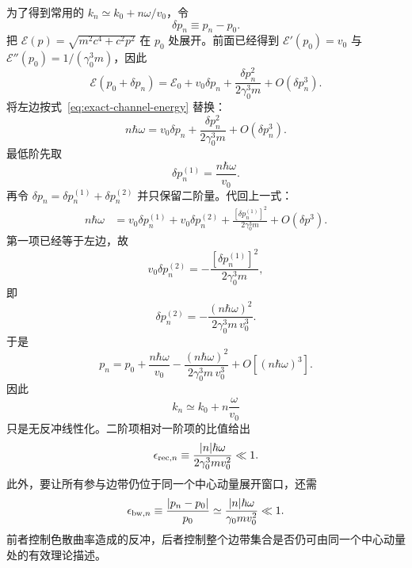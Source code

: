为了得到常用的 $k_n\simeq k_0+n\omega/v_0$，令
\begin{equation}
\delta p_n\equiv p_n-p_0.
\end{equation}
把
\(
\mathcal E(p)=\sqrt{m^2c^4+c^2p^2}
\)
在 $p_0$ 处展开。前面已经得到
\(
\mathcal E'(p_0)=v_0
\)
与
\(
\mathcal E''(p_0)=1/(\gamma_0^3m)
\)，因此
\begin{equation}
\mathcal E(p_0+\delta p_n)
=\mathcal E_0
+v_0\delta p_n
+\frac{\delta p_n^2}{2\gamma_0^3m}
+O(\delta p_n^3).
\label{eq:dispersion-channel-expand}
\end{equation}
将左边按式~\cref{eq:exact-channel-energy} 替换：
\begin{equation}
n\hbar\omega
=v_0\delta p_n
+\frac{\delta p_n^2}{2\gamma_0^3m}
+O(\delta p_n^3).
\label{eq:channel-energy-balance-expanded}
\end{equation}
最低阶先取
\begin{equation}
\delta p_n^{(1)}=\frac{n\hbar\omega}{v_0}.
\end{equation}
再令
\(
\delta p_n=\delta p_n^{(1)}+\delta p_n^{(2)}
\)
并只保留二阶量。代回上一式：
\begin{align}
n\hbar\omega
&=v_0\delta p_n^{(1)}
+v_0\delta p_n^{(2)}
+\frac{[\delta p_n^{(1)}]^2}{2\gamma_0^3m}
+O(\delta p^3).
\end{align}
第一项已经等于左边，故
\begin{equation}
v_0\delta p_n^{(2)}
=-\frac{[\delta p_n^{(1)}]^2}{2\gamma_0^3m},
\end{equation}
即
\begin{equation}
\delta p_n^{(2)}
=-\frac{(n\hbar\omega)^2}{2\gamma_0^3m\,v_0^3}.
\end{equation}
于是
\begin{equation}
{
p_n=p_0+\frac{n\hbar\omega}{v_0}
-\frac{(n\hbar\omega)^2}{2\gamma_0^3m\,v_0^3}
+O[(n\hbar\omega)^3].}
\label{eq:channel-momentum-recoil-series}
\end{equation}
因此
\begin{equation}
k_n\simeq k_0+n\frac{\omega}{v_0}
\label{eq:linear-channel-k}
\end{equation}
只是无反冲线性化。二阶项相对一阶项的比值给出
\begin{equation}
{
\epsilon_{{\rm rec},n}
\equiv
\frac{|n|\hbar\omega}{2\gamma_0^3m v_0^2}\ll1.}
\label{eq:recoil-small-parameter}
\end{equation}
此外，要让所有参与边带仍位于同一个中心动量展开窗口，还需
\begin{equation}
{
\epsilon_{{\rm bw},n}
\equiv\frac{|p_n-p_0|}{p_0}
\simeq
\frac{|n|\hbar\omega}{\gamma_0m v_0^2}\ll1.}
\label{eq:sideband-bandwidth-condition}
\end{equation}
前者控制色散曲率造成的反冲，后者控制整个边带集合是否仍可由同一个中心动量处的有效理论描述。


